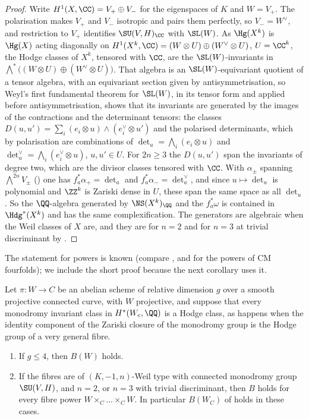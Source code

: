 \begin{proof}
Write $H^{1}(X,\CC)=V_{+}\oplus V_{-}$ for the eigenspaces of $K$ and
$W=V_{+}$. The polarisation makes $V_{+}$ and $V_{-}$ isotropic and pairs them
perfectly, so $V_{-}=W^{\vee}$, and restriction to $V_{+}$ identifies
$\SU(V,H)_{\CC}$ with $\SL(W)$. As $\Hg(X^{k})$ is $\Hg(X)$ acting diagonally
on $H^{1}(X^{k},\CC)=(W\otimes U)\oplus(W^{\vee}\otimes U)$, $U=\CC^{k}$, the
Hodge classes of $X^{k}$, tensored with $\CC$, are the $\SL(W)$-invariants in
$\bigwedge^{*}\bigl((W\otimes U)\oplus(W^{\vee}\otimes U)\bigr)$. That algebra
is an $\SL(W)$-equivariant quotient of a tensor algebra, with an equivariant
section given by antisymmetrisation, so Weyl's first fundamental theorem for
$\SL(W)$, in its tensor form and applied before antisymmetrisation, shows
that its invariants are generated by the images of the contractions and the
determinant tensors: the classes
$D(u,u')=\sum_{i}(e_{i}\otimes u)\wedge(e_{i}^{\vee}\otimes u')$ and the
polarised determinants, which by polarisation are combinations of
$\det_{u}=\bigwedge_{i}(e_{i}\otimes u)$ and
$\det^{\vee}_{u}=\bigwedge_{i}(e_{i}^{\vee}\otimes u)$, $u,u'\in U$. For
$2n\ge3$ the $D(u,u')$ span the invariants of degree two, which are the
divisor classes tensored with $\CC$. With $\alpha_{\pm}$ spanning
$\bigwedge^{2n}V_{\pm}$ (\cite[Proposition~3.7]{paperI}) one has
$f_{a}^{*}\alpha_{+}=\det_{a}$ and $f_{a}^{*}\alpha_{-}=\det^{\vee}_{a}$, and
since $u\mapsto\det_{u}$ is polynomial and $\ZZ^{k}$ is Zariski dense in
$U$, these span the same space as all $\det_{u}$. So the $\QQ$-algebra
generated by $\NS(X^{k})_{\QQ}$ and the $f_{a}^{*}\omega$ is contained in
$\Hdg^{*}(X^{k})$ and has the same complexification. The generators are
algebraic when the Weil classes of $X$ are, and they are for $n=2$ and for
$n=3$ at trivial discriminant by \cite{Mar25a}.
\end{proof}

The statement for powers is known (compare \cite{Mil22}, and \cite{Li26}
for the powers of CM fourfolds); we include the short proof because the next
corollary uses it.

\begin{corollary}
\label{cor:lefschetzsmall}
Let $\pi\colon W\to C$ be an abelian scheme of relative dimension $g$ over a
smooth projective connected curve, with $W$ projective, and suppose that
every monodromy invariant class in $H^{*}(W_{c},\QQ)$ is a Hodge class, as
happens when the identity component of the Zariski closure of the monodromy
group is the Hodge group of a very general fibre.
\begin{enumerate}[label=\textup{(\roman*)},leftmargin=2.6em,itemsep=2pt]
\item If $g\le4$, then $B(W)$ holds.
\item If the fibres are of $(K,-1,n)$-Weil type with connected monodromy
  group $\SU(V,H)$, and $n=2$, or $n=3$ with trivial discriminant, then
  $B$ holds for every fibre power $W\times_{C}\dots\times_{C}W$. In
  particular $B(W_{C})$ of  holds in these cases.
\end{enumerate}
\end{corollary}

